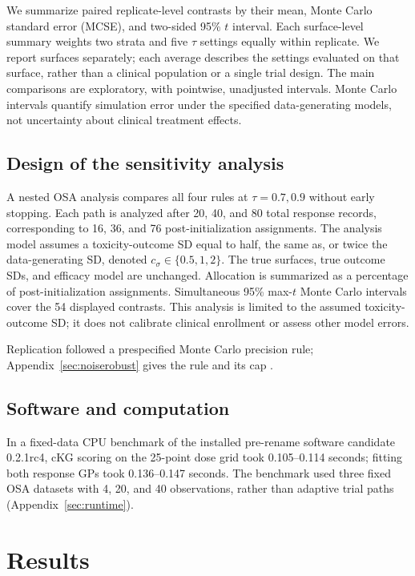 \documentclass[11pt]{article}
\newcommand{\rev}[1]{{#1}}
\begin{document}
We summarize paired replicate-level contrasts by their mean, Monte Carlo standard error (MCSE), and two-sided 95\% $t$ interval. \rev{Each surface-level summary weights two strata and five $\tau$ settings equally within replicate. We report surfaces separately; each average describes the settings evaluated on that surface, rather than a clinical population or a single trial design.} \rev{The main comparisons are exploratory, with pointwise, unadjusted intervals.} Monte Carlo intervals quantify simulation error under the specified data-generating models, not uncertainty about clinical treatment effects.

\subsection{\rev{Design of the sensitivity analysis}}\label{sec:calibrationaudit}

A nested OSA analysis compares all four rules at $\tau=0.7,0.9$ without early stopping. Each path is analyzed after 20, 40, and 80 total response records, corresponding to 16, 36, and 76 post-initialization assignments. The analysis model assumes a toxicity-outcome SD equal to half, the same as, or twice the data-generating SD, denoted $c_\sigma\in\{0.5,1,2\}$. The true surfaces, true outcome SDs, and efficacy model are unchanged. Allocation is summarized as a percentage of post-initialization assignments. Simultaneous 95\% max-$t$ Monte Carlo intervals cover the 54 displayed contrasts. \rev{This analysis is limited to the assumed toxicity-outcome SD; it does not calibrate clinical enrollment or assess other model errors.}

Replication followed a prespecified Monte Carlo precision rule; Appendix~\ref{sec:noiserobust} gives the rule and its cap \citep{morris2019,koehler2009,burton2006}.

\subsection{\rev{Software and computation}}

\rev{In a fixed-data CPU benchmark of the installed pre-rename software candidate 0.2.1rc4, cKG scoring on the 25-point dose grid took 0.105--0.114 seconds; fitting both response GPs took 0.136--0.147 seconds. The benchmark used three fixed OSA datasets with 4, 20, and 40 observations, rather than adaptive trial paths (Appendix~\ref{sec:runtime}).}

\section{Results}\label{sec:results}
\end{document}
